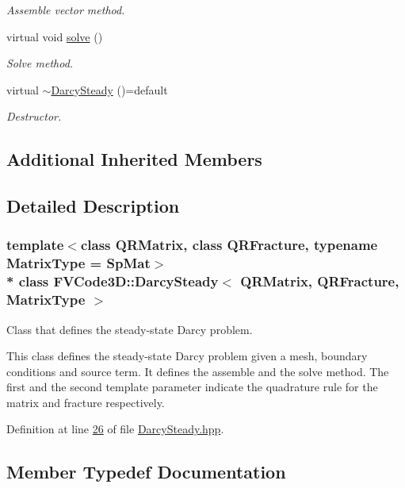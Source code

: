 \begin{DoxyCompactItemize}
\begin{DoxyCompactList}\small\item\em Assemble vector method. \end{DoxyCompactList}\item 
virtual void \hyperlink{classFVCode3D_1_1DarcySteady_aaa82aad9d7006a5c1e96e103f602082b}{solve} ()
\begin{DoxyCompactList}\small\item\em Solve method. \end{DoxyCompactList}\item 
virtual \hyperlink{classFVCode3D_1_1DarcySteady_a8f93f039f8607d9899391cdcaa3600b0}{$\sim$\+Darcy\+Steady} ()=default
\begin{DoxyCompactList}\small\item\em Destructor. \end{DoxyCompactList}\end{DoxyCompactItemize}
\subsection*{Additional Inherited Members}


\subsection{Detailed Description}
\subsubsection*{template$<$class Q\+R\+Matrix, class Q\+R\+Fracture, typename Matrix\+Type = Sp\+Mat$>$\\*
class F\+V\+Code3\+D\+::\+Darcy\+Steady$<$ Q\+R\+Matrix, Q\+R\+Fracture, Matrix\+Type $>$}

Class that defines the steady-\/state Darcy problem. 

This class defines the steady-\/state Darcy problem given a mesh, boundary conditions and source term. It defines the assemble and the solve method. The first and the second template parameter indicate the quadrature rule for the matrix and fracture respectively. 

Definition at line \hyperlink{DarcySteady_8hpp_source_l00026}{26} of file \hyperlink{DarcySteady_8hpp_source}{Darcy\+Steady.\+hpp}.



\subsection{Member Typedef Documentation}
